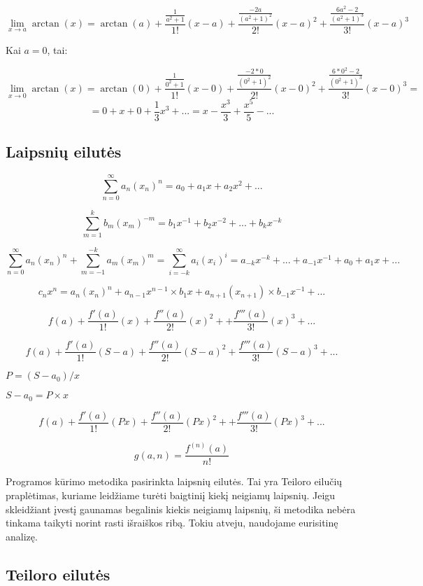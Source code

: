 \[\lim_{x \to a} \arctan(x) = \arctan(a) + \frac{\frac{1}{a^2+1}}{1!}(x-a) + \frac{\frac{-2a}{(a^2+1)^2}}{2!}(x-a)^2 + \frac{\frac{6a^2-2}{(a^2+1)^3}}{3!}(x-a)^3 \]

Kai $a = 0$, tai: 

\[\lim_{x \to 0} \arctan(x) = \arctan(0) + \frac{\frac{1}{0^2+1}}{1!}(x-0) + \frac{\frac{-2*0}{(0^2+1)^2}}{2!}(x-0)^2 + \frac{\frac{6*0^2-2}{(0^2+1)^3}}{3!}(x-0)^3 =\]
\[= 0 + x + 0 + \frac{1}{3} x^3 +... = x - \frac{x^3}{3} + \frac{x^5}{5} - ... \]




\subsection{Laipsnių eilutės}


\[\sum_{n=0}^{\infty} a_n(x_n)^n = a_0 + a_1 x + a_2 x^2 + ...\]

\[\sum_{m=1}^{k} b_m(x_m)^{-m} = b_1 x^{-1} + b_2 x^{-2} + ... + b_k x^{-k}\]

\[\sum_{n=0}^{\infty} a_n(x_n)^n + \sum_{m=-1}^{-k} a_m(x_m)^m = \sum_{i=-k}^{\infty} a_i(x_i)^i  = a_{-k} x^{-k} + ... + a_{-1} x^{-1} + a_0 + a_1 x + ... \]

\[c_n x^n = a_n(x_n)^n + a_{n-1}x^{n-1} \times b_{1}{x} + a_{n+1}(x_{n+1}) \times b_{-1}x^{-1} + ...\]

\[f(a) + \frac{f'(a)}{1!}(x)+\frac{f''(a)}{2!}(x)^2 + +\frac{f'''(a)}{3!}(x)^3 + ...\]

\[f(a) + \frac{f'(a)}{1!}(S-a)+\frac{f''(a)}{2!}(S-a)^2 + \frac{f'''(a)}{3!}(S-a)^3 + ...\]

$P = (S - a_0)/x$

$S - a_0 = P \times x$

\[f(a) + \frac{f'(a)}{1!}(Px)+\frac{f''(a)}{2!}(Px)^2 + +\frac{f'''(a)}{3!}(Px)^3 + ...\]

\[ g(a,n) = \frac{f^{(n)}(a)}{n!}\]











Programos kūrimo metodika pasirinkta laipsnių eilutės. 
Tai yra Teiloro eilučių praplėtimas, kuriame leidžiame turėti baigtiniį kiekį neigiamų laipsnių. 
Jeigu skleidžiant įvestį gaunamas begalinis kiekis neigiamų laipsnių, ši metodika nebėra tinkama taikyti norint rasti išraiškos ribą.
Tokiu atveju, naudojame eurisitinę analizę. 

\subsection{Teiloro eilutės}
	
